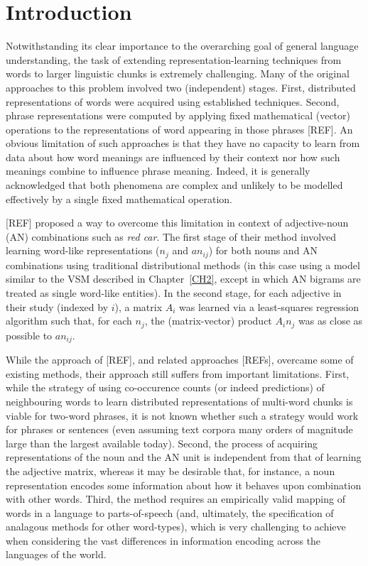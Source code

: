 \label{CH4}
\section{Introduction}

Notwithstanding its clear importance to the overarching goal of general language understanding, the task of extending representation-learning techniques from words to larger linguistic chunks is extremely challenging. Many of the original approaches to this problem involved two (independent) stages. First, distributed representations of words were acquired using established techniques. Second, phrase representations were computed by applying fixed mathematical (vector) operations to the representations of word appearing in those phrases [REF]. An obvious limitation of such approaches is that they have no capacity to learn from data about how word meanings are influenced by their context nor how such meanings combine to influence phrase meaning. Indeed, it is generally acknowledged that both phenomena are complex and unlikely to be modelled effectively by a single fixed mathematical operation.  

[REF] proposed a way to overcome this limitation in context of adjective-noun (AN) combinations such as \emph{red car}. The first stage of their method involved learning word-like representations (\(n_j\) and \(an_{ij}\)) for both nouns and AN combinations using traditional distributional methods (in this case using a model similar to the VSM described in Chapter~\ref{CH2}, except in which AN bigrams are treated as single word-like entities). In the second stage, for each adjective in their study (indexed by \(i\)), a matrix \(A_i\) was learned via a least-squares regression algorithm such that, for each \(n_j\), the (matrix-vector) product \(A_i n_j\) was as close as possible to \(an_{ij}\).

While the approach of [REF], and related approaches [REFs], overcame some of existing methods, their approach still suffers from important limitations. First, while the strategy of using co-occurence counts (or indeed predictions) of neighbouring words to learn distributed representations of multi-word chunks is viable for two-word phrases, it is not known whether such a strategy would work for phrases or sentences (even assuming text corpora many orders of magnitude large than the largest available today). Second, the process of acquiring representations of the noun and the AN unit is independent from that of learning the adjective matrix, whereas it may be desirable that, for instance, a noun representation encodes some information about how it behaves upon combination with other words. Third, the method requires an empirically valid mapping of words in a language to parts-of-speech (and, ultimately, the specification of analagous methods for other word-types), which is very challenging to achieve when considering the vast differences in information encoding across the languages of the world. 

